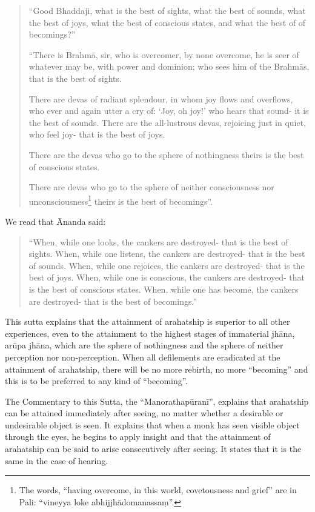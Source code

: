 \begin{quote}
``Good Bhaddaji, what is the best of sights, what the best of sounds, what the best of joys, what the best of conscious states, and what the best of of becomings?''

``There is Brahmā, sir, who is overcomer, by none overcome, he is seer of whatever may be, with power and dominion; who sees him of the Brahmās, that is the best of sights.

There are devas of radiant splendour, in whom joy flows and overflows, who ever and again utter a cry of: ‘Joy, oh joy!’ who hears that sound- it is the best of sounds.
There are the all-lustrous devas, rejoicing just in quiet, who feel joy- that is the best of joys.

There are the devas who go to the sphere of nothingness theirs is the best of conscious states.

There are devas who go to the sphere of neither consciousness nor unconsciousness\footnote{The words, ``having overcome, in this world, covetousness and grief'' are in Pali: ``vineyya loke abhijjhādomanassaṃ''.} theirs is the best of becomings''.
\end{quote}
We read that Ānanda said:
\begin{quote}

``When, while one looks, the cankers are destroyed- that is the best of sights.
When, while one listens, the cankers are destroyed- that is the best of sounds.
When, while one rejoices, the cankers are destroyed- that is the best of joys.
When, while one is conscious, the cankers are destroyed- that is the best of conscious states.
When, while one has become, the cankers are destroyed- that is the best of becomings.''
\end{quote}

This sutta explains that the attainment of arahatship is superior to all other experiences, even to the attainment to the highest stages of immaterial jhāna, arūpa jhāna, which are the sphere of nothingness and the sphere of neither perception nor non-perception. When all defilements are eradicated at the attainment of arahatship, there will be no more rebirth, no more ``becoming'' and this is to be preferred to any kind of ``becoming''.

The Commentary to this Sutta, the ``Manorathapūranī'', explains that arahatship can be attained immediately after seeing, no matter whether a desirable or undesirable object is seen. It explains that when a monk has seen visible object through the eyes, he begins to apply insight and that the attainment of arahatship can be said to arise consecutively after seeing. It states that it is the same in the case of hearing.

